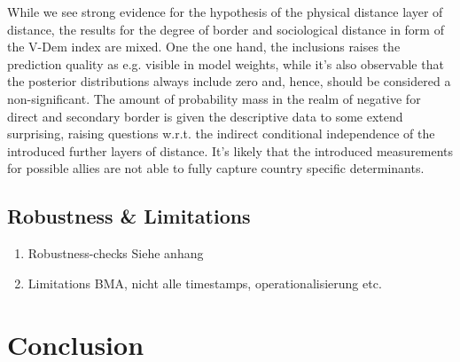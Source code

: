 \documentclass[12pt,a4paper]{article}
\begin{document}
While we see strong evidence for the hypothesis of the physical distance layer of distance, the results for the degree of border and sociological distance in form of the V-Dem index are mixed. One the one hand, the inclusions raises the prediction quality as e.g. visible in model weights, while it's also observable that the posterior distributions always include zero and, hence, should be considered a non-significant. The amount of probability mass in the realm of negative for direct and secondary border is given the descriptive data to some extend surprising, raising questions w.r.t. the indirect conditional independence of the introduced further layers of distance. It's likely that the introduced measurements for possible allies are not able to fully capture country specific determinants. 
\clearpage
\subsection{Robustness \& Limitations}
\begin{enumerate}
\item Robustness-checks  Siehe anhang
\item Limitations BMA, nicht alle timestamps, operationalisierung etc. 
\end{enumerate}
\clearpage
\section{Conclusion}
\end{document}
